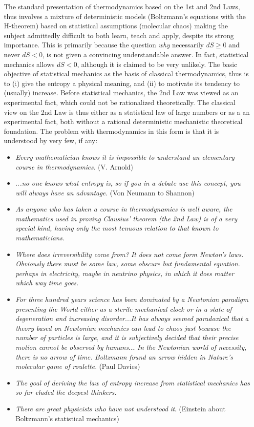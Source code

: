 The standard presentation of thermodynamics based on the
1st and 2nd Laws, thus involves a mixture of deterministic
models (Boltzmann's equations with the H-theorem) based on
statistical assumptions (molecular chaos) making the subject
admittedly difficult to both learn, teach and apply,
despite its strong importance. This is primarily because the question \emph{why}
necessarily $dS\ge 0$ and never $dS<0$, is not
given a convincing understandable answer.
In fact, statistical mechanics allows
$dS<0$, although it is claimed to be very unlikely. The basic objective
of statistical mechanics as the basis of classical thermodynamics,
thus is to (i) give the entropy a physical meaning, and (ii) to motivate
its tendency to (usually) increase. Before statistical mechanics,
the 2nd Law was viewed as an experimental fact, which could not
be rationalized theoretically. The classical view on the 2nd Law
is thus either as a statistical law of large numbers or as a an
experimental fact, both without a rational deterministic mechanistic
theoretical foundation. The problem with thermodynamics in this form
is that it is understood by very few, if any:

\small
\begin{itemize}
\item \emph{Every mathematician knows it is impossible to understand
an elementary course in thermodynamics.} (V. Arnold)
\item \emph{...no one knows what entropy is, so if you in a debate use
this concept, you will always have an advantage.} (Von Neumann to Shannon)
\item \emph{As anyone who has taken a course in thermodynamics is well aware,
the mathematics used in proving Clausius' theorem (the 2nd Law) is of a very
special kind, having only the most tenuous relation to that known to
mathematicians.} \cite{brush}
\item \emph{Where does irreversibility come from? It does not come
form Newton's laws. Obviously there must be some law, some
obscure but fundamental equation. perhaps in electricity,
maybe in neutrino physics, in which it does
matter which way time goes.} \cite{feynman}
\item
\emph{For three hundred years science has been dominated by
a Newtonian paradigm presenting the World either
as a sterile mechanical clock or in a state of degeneration
and increasing disorder...It has always seemed paradoxical
that a theory based on Newtonian mechanics can lead
to chaos just because the number of particles is large,
and it is subjectively decided that their precise motion cannot be
observed by humans... In the Newtonian world of necessity, there
is no arrow of time. Boltzmann found an arrow hidden in
Nature's molecular game of roulette.}
(Paul Davies)%
\item \emph{The goal of deriving the law of entropy increase
from statistical mechanics has so far eluded the deepest
thinkers.} \cite{lieb}
\item \emph{There are great physicists who have not understood it}.
(Einstein about Boltzmann's statistical mechanics)
\end{itemize}
\normalsize


